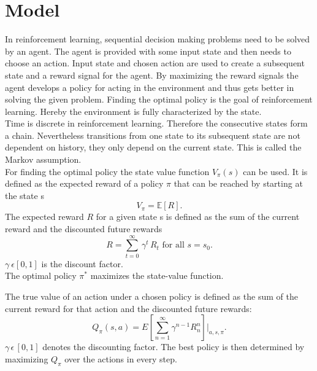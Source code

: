 \documentclass[12pt]{article}
\begin{document}
\section{Model}
In reinforcement learning, sequential decision making problems need to be solved by an agent. The agent is provided with some input state and then needs to choose an action. Input state and chosen action are used to create a subsequent state and a reward signal for the agent. By maximizing the reward signals the agent develops a policy for acting in the environment and thus gets better in solving the given problem. Finding the optimal policy is the goal of reinforcement learning.
Hereby the environment is fully characterized by the state. \\
Time is discrete in reinforcement learning. Therefore the consecutive states form a chain.
Nevertheless transitions from one state to its subsequent state are not dependent on history, they only depend on the current state. This is called the Markov assumption. \\
For finding the optimal policy the state value function $V_\pi(s)$ can be used. It is defined as the expected reward of a policy $\pi$ that can be reached by starting at the state s
\begin{equation}
V_\pi=\mathbb{E}\left[R\right].
\end{equation}
The expected reward $R$ for a given state s is defined as the sum of the current reward and the discounted future rewards
\begin{equation}
R=\sum^\infty_{t=0}\,\gamma^t\,R_t \textrm{ for all } s=s_0.
\end{equation}
$\gamma\:\epsilon\left[0,1\right]$ is the discount factor.\\
The optimal policy $\pi^*$ maximizes the state-value function.


The true value of an action under a chosen policy is defined as the sum of the current reward for that action and the discounted future rewards:
\begin{equation}
Q_\pi(s,a)= E\left[\sum_{n=1}^{\infty} \gamma^{n-1}R_n^n\right] \Bigg|_{a,s,\pi}.
\end{equation} 
$\gamma\,\epsilon\,[0,1]$ denotes the discounting factor.
The best policy is then determined by maximizing $Q_\pi$ over the actions in every step.
\end{document}
